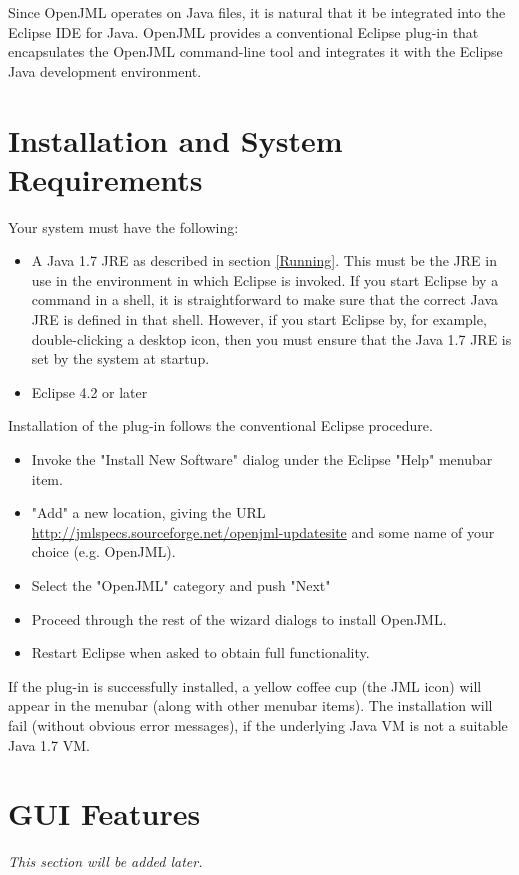 \documentclass{report}%
\begin{document}
Since OpenJML operates on Java files, it is natural that it be integrated into the Eclipse IDE for Java.
OpenJML provides a conventional Eclipse plug-in that encapsulates the OpenJML command-line tool and integrates it
with the Eclipse Java development environment.

\section{Installation and System Requirements}
Your system must have the following:
\begin{itemize}
\item A Java 1.7 JRE as described in section \ref{Running}. This must be the JRE in use in the environment in which Eclipse is invoked. If you start Eclipse by a command in a shell, it is straightforward to make sure that the correct Java JRE is defined in that shell.  However, if you start Eclipse by, for example, double-clicking a desktop icon, then you must ensure that the Java 1.7 JRE is set by the system at startup.
\item Eclipse 4.2 or later
\end{itemize}

Installation of the plug-in follows the conventional Eclipse procedure.
\begin{itemize}
\item Invoke the "Install New Software" dialog under the Eclipse "Help" menubar item.
\item "Add" a new location, giving the URL \url{http://jmlspecs.sourceforge.net/openjml-updatesite} and some name of your choice (e.g. OpenJML).
\item Select the "OpenJML" category and push "Next"
\item Proceed through the rest of the wizard dialogs to install OpenJML.
\item Restart Eclipse when asked to obtain full functionality.
\end{itemize}

If the plug-in is successfully installed, a yellow coffee cup (the JML icon) will appear in the menubar (along with other menubar items).
The installation will fail (without obvious error messages), if the underlying Java VM is not a suitable Java 1.7 VM.

\section{GUI Features}

\textit{This section will be added later.} %
\end{document}
